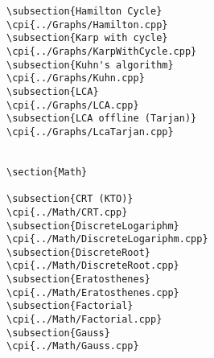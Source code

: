 {\begin{verbatim}
\subsection{Hamilton Cycle}
\cpi{../Graphs/Hamilton.cpp}
\subsection{Karp with cycle}
\cpi{../Graphs/KarpWithCycle.cpp}
\subsection{Kuhn's algorithm}
\cpi{../Graphs/Kuhn.cpp}
\subsection{LCA}
\cpi{../Graphs/LCA.cpp}
\subsection{LCA offline (Tarjan)}
\cpi{../Graphs/LcaTarjan.cpp}


\section{Math}

\subsection{CRT (KTO)}
\cpi{../Math/CRT.cpp}
\subsection{DiscreteLogariphm}
\cpi{../Math/DiscreteLogariphm.cpp}
\subsection{DiscreteRoot}
\cpi{../Math/DiscreteRoot.cpp}
\subsection{Eratosthenes}
\cpi{../Math/Eratosthenes.cpp}
\subsection{Factorial}
\cpi{../Math/Factorial.cpp}
\subsection{Gauss}
\cpi{../Math/Gauss.cpp}

\end{verbatim}}
